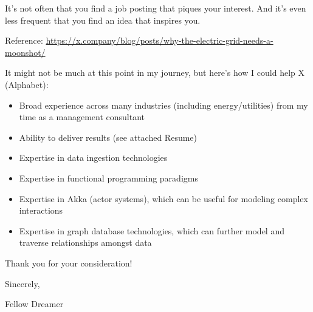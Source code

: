 \documentclass{article}
\begin{document}
It's not often that you find a job posting that piques your interest. And it's even less frequent that you find an idea that inspires you.

Reference: \url{https://x.company/blog/posts/why-the-electric-grid-needs-a-moonshot/}

It might not be much at this point in my journey, but here's how I could help X (Alphabet):

\begin{itemize}
  \item Broad experience across many industries (including energy/utilities) from my time as a management consultant
  \item Ability to deliver results (see attached Resume)
  \item Expertise in data ingestion technologies
  \item Expertise in functional programming paradigms
  \item Expertise in Akka (actor systems), which can be useful for modeling complex interactions
  \item Expertise in graph database technologies, which can further model and traverse relationships amongst data
\end{itemize}

Thank you for your consideration!

\bigskip %

Sincerely,

\vspace{50pt} %

Fellow Dreamer
\end{document}
